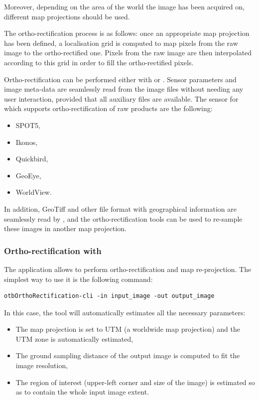 Moreover, depending on the area of the world the image has been
acquired on, different map projections should be used.

The ortho-rectification process is as follows: once an appropriate map
projection has been defined, a localisation grid is computed to map
pixels from the raw image to the ortho-rectified one. Pixels from the
raw image are then interpolated according to this grid in order to
fill the ortho-rectified pixels.

Ortho-rectification can be performed either with \app or \mont. Sensor
parameters and image meta-data are seamlessly read from the image
files without needing any user interaction, provided that all
auxiliary files are available. The sensor for which \otb
supports ortho-rectification of raw products are the following:
\begin{itemize}
\item SPOT5,
\item Ikonos,
\item Quickbird,
\item GeoEye,
\item WorldView.
\end{itemize}

In addition, GeoTiff and other file format with geographical
information are seamlessly read by \otb, and the ortho-rectification
tools can be used to re-sample these images in another map projection.

\subsubsection{Ortho-rectification with \app}

The  application allows to
perform ortho-rectification and map re-projection. The simplest way to
use it is the following command:
\begin{verbatim}
otbOrthoRectification-cli -in input_image -out output_image
\end{verbatim}

In this case, the tool will automatically estimates all the necessary
parameters:
\begin{itemize}
\item The map projection is set to UTM (a worldwide map projection)
  and the UTM zone is automatically estimated,
\item The ground sampling distance of the output image is computed to
  fit the image resolution,
\item The region of interest (upper-left corner and size of the image)
  is estimated so as to contain the whole input image extent.
\end{itemize}

